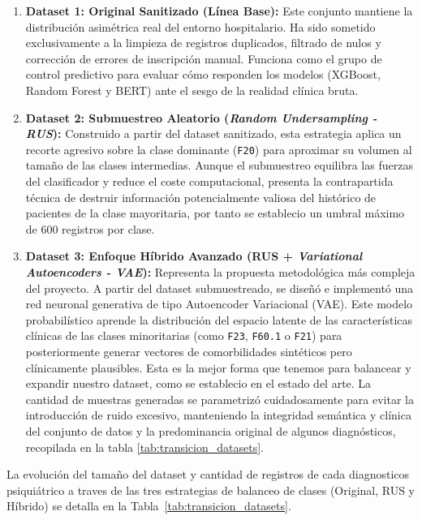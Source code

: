\documentclass[12pt,a4paper,onecolumn,oneside]{report}
\begin{document}
\begin{enumerate}
    \item \textbf{Dataset 1: Original Sanitizado (Línea Base):} Este conjunto mantiene la distribución asimétrica real del entorno hospitalario. Ha sido sometido exclusivamente a la limpieza de registros duplicados, filtrado de nulos y corrección de errores de inscripción manual. Funciona como el grupo de control predictivo para evaluar cómo responden los modelos (XGBoost, Random Forest y BERT) ante el sesgo de la realidad clínica bruta.
    
    \item \textbf{Dataset 2: Submuestreo Aleatorio (\textit{Random Undersampling - RUS}):} Construido a partir del dataset sanitizado, esta estrategia aplica un recorte agresivo sobre la clase dominante (\texttt{F20}) para aproximar su volumen al tamaño de las clases intermedias. Aunque el submuestreo equilibra las fuerzas del clasificador y reduce el coste computacional, presenta la contrapartida técnica de destruir información potencialmente valiosa del histórico de pacientes de la clase mayoritaria, por tanto se establecio un umbral máximo de 600 registros por clase.
    
    \item \textbf{Dataset 3: Enfoque Híbrido Avanzado (RUS + \textit{Variational Autoencoders - VAE}):} Representa la propuesta metodológica más compleja del proyecto. A partir del dataset submuestreado, se diseñó e implementó una red neuronal generativa de tipo Autoencoder Variacional (VAE). Este modelo probabilístico aprende la distribución del espacio latente de las características clínicas de las clases minoritarias (como \texttt{F23}, \texttt{F60.1} o \texttt{F21}) para posteriormente generar vectores de comorbilidades sintéticos pero clínicamente plausibles. Esta es la mejor forma que tenemos para balancear y expandir nuestro dataset, como se establecio en el estado del arte\cite{saboori2025predictive}. La cantidad de muestras generadas se parametrizó cuidadosamente para evitar la introducción de ruido excesivo, manteniendo la integridad semántica y clínica del conjunto de datos y la predominancia original de algunos diagnósticos, recopilada en la tabla \ref{tab:transicion_datasets}.
\end{enumerate}

La evolución del tamaño del dataset y cantidad de registros de cada diagnosticos psiquiátrico a traves de las tres estrategias de balanceo de clases (Original, RUS y Híbrido) se detalla en la Tabla~\ref{tab:transicion_datasets}.
\end{document}
